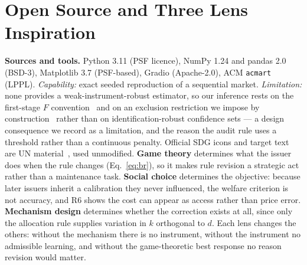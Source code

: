 \section{Open Source and Three Lens Inspiration}
\textbf{Sources and tools.} Python 3.11 (PSF licence), NumPy 1.24 and pandas 2.0 (BSD-3), Matplotlib 3.7 (PSF-based), Gradio (Apache-2.0), ACM \texttt{acmart} (LPPL). \emph{Capability:} exact seeded reproduction of a sequential market. \emph{Limitation:} none provides a weak-instrument-robust estimator, so our inference rests on the first-stage $F$ convention~\cite{staiger1997,andrews2019} and on an exclusion restriction we impose by construction~\cite{pearl1995} rather than on identification-robust confidence sets --- a design consequence we record as a limitation, and the reason the audit rule uses a threshold rather than a continuous penalty. Official SDG icons and target text are UN material~\cite{un_sdg_icons,un_sdg}, used unmodified.
\textbf{Game theory} determines what the issuer does when the rule changes (Eq.~\ref{eq:br}), so it makes rule revision a strategic act rather than a maintenance task. \textbf{Social choice} determines the objective: because later issuers inherit a calibration they never influenced, the welfare criterion is not accuracy, and R6 shows the cost can appear as access rather than price error. \textbf{Mechanism design} determines whether the correction exists at all, since only the allocation rule supplies variation in $k$ orthogonal to $d$. Each lens changes the others: without the mechanism there is no instrument, without the instrument no admissible learning, and without the game-theoretic best response no reason revision would matter.

